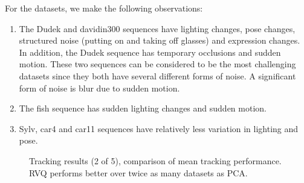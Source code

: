 \begin{Body}
For the datasets, we make the following observations:

\begin{enumerate}
\item The Dudek and davidin300 sequences have lighting changes, pose changes, structured noise (putting on and taking off glasses) and expression changes.  In addition, the Dudek sequence has temporary occlusions and sudden motion.  These two sequences can be considered to be the most challenging datasets since they both have several different forms of noise.  A significant form of noise is blur due to sudden motion.  
\item The fish sequence has sudden lighting changes and sudden motion.
\item Sylv, car4 and car11 sequences have relatively less variation in lighting and pose.
\end{enumerate}

								\begin{figure}[t]
								\centering
								
								\caption{Tracking results (2 of 5), comparison of mean tracking performance.  RVQ performs better over twice as many datasets as PCA.}
								\label{fig:results_final_2_mean}
								\end{figure}



\end{Body}
